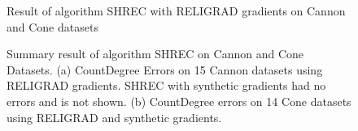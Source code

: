 \begin{figure}[t]
	\caption{Result of algorithm SHREC with RELIGRAD gradients on Cannon and Cone datasets}
	\label{fig:cannon_cone}
\end{figure}

\begin{figure}[t]
	\caption{Summary result of algorithm SHREC on Cannon and Cone Datasets. (a) CountDegree Errors on 15 Cannon datasets using RELIGRAD gradients. SHREC with synthetic gradients had no errors and is not shown. (b) CountDegree errors on 14 Cone datasets using RELIGRAD and synthetic gradients.}
	\label{fig:cannon_cone_summary}
\end{figure}

